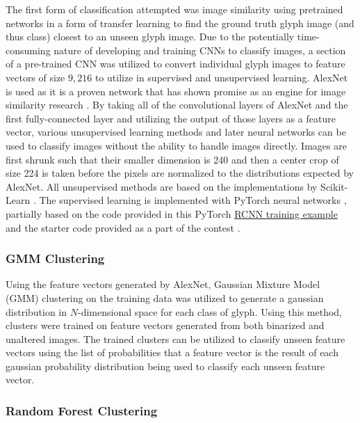 The first form of classification attempted was image similarity using pretrained networks in a form of transfer learning to find the ground truth glyph image (and thus class) closest to an unseen glyph image. Due to the potentially time-consuming nature of developing and training CNNs to classify images, a section of a pre-trained CNN was utilized to convert individual glyph images to feature vectors of size $9,216$ to utilize in supervised and unsupervised learning. AlexNet \cite{Krizhevsky} is used as it is a proven network that has shown promise as an engine for image similarity research \cite{Vadicamo, Yuan}. By taking all of the convolutional layers of AlexNet and the first fully-connected layer and utilizing the output of those layers as a feature vector, various unsupervised learning methods and later neural networks can be used to classify images without the ability to handle images directly. Images are first shrunk such that their smaller dimension is 240 and then a center crop of size 224 is taken before the pixels are normalized to the distributions expected by AlexNet. All unsupervised methods are based on the implementations by Scikit-Learn \cite{Scikit}. The supervised learning is implemented with PyTorch neural networks \cite{PyTorch}, partially based on the code provided in this PyTorch \href{https://pytorch.org/tutorials/intermediate/torchvision\_tutorial.html}{RCNN training example} and the starter code provided as a part of the contest \cite{Contest}.

\subsubsection{GMM Clustering}

Using the feature vectors generated by AlexNet, Gaussian Mixture Model (GMM) clustering on the training data was utilized to generate a gaussian distribution in $N$-dimensional space for each class of glyph. Using this method, clusters were trained on feature vectors generated from both binarized and unaltered images. The trained clusters can be utilized to classify unseen feature vectors using the list of probabilities that a feature vector is the result of each gaussian probability distribution being used to classify each unseen feature vector.

\subsubsection{Random Forest Clustering}

